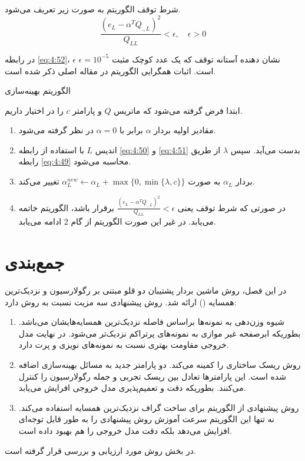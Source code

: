 شرط توقف الگوریتم  به صورت زیر تعریف می‌شود.
\begin{equation}\label{eq:4:52}
\frac{(e_{L} - \alpha^{T}Q_{.,L})^{2}}{Q_{LL}} < \epsilon, \quad \epsilon > 0
\end{equation}

در رابطه \ref{eq:4:52}،  $\epsilon$ نشان دهنده آستانه توقف که یک عدد کوچک مثبت  $\epsilon=10^{-5}$ است. اثبات همگرایی الگوریتم  در مقاله اصلی \cite{peng2014} ذکر شده است. 

\begin{algo}
	الگوریتم بهینه‌سازی 

ابتدا فرض گرفته می‌شود که ماتریس $Q$  و پارامتر $c$  را در اختیار داریم.

\begin{enumerate}
	\item 	مقادیر اولیه بردار $\alpha$  برابر با $\alpha=0$  در نظر گرفته می‌شود.
	\item 	اندیس $L$  با استفاده از رابطه \ref{eq:4:50} و \ref{eq:4:51} بدست می‌آید. سپس $\lambda$  از طریق رابطه \ref{eq:4:49} محاسبه می‌شود.
	\item 	بردار $\alpha_{L}$  به صورت $\alpha^{new}_{L} \leftarrow \alpha_{L} + \mathop{max}\{0, \mathop{min}\{\lambda,c\}\}$  تغییر می‌کند.
	\item 	در صورتی که شرط توقف یعنی $\frac{(e_{L} - \alpha^{T}Q_{.,L})^{2}}{Q_{LL}} < \epsilon$  برقرار باشد، الگوریتم خاتمه می‌یابد. در غیر این صورت الگوریتم از گام 2 ادامه می‌یابد.
\end{enumerate}
\end{algo}

\section{جمع‌بندی}\label{sec:4:8}
در این فصل، روش ماشین بردار پشتیبان دو قلو مبتنی بر رگولارسیون و نزدیک‌ترین همسایه () ارائه شد. روش پیشنهادی سه مزیت نسبت به روش  دارد:
\begin{enumerate}
	\item 	شیوه وزن‌دهی به نمونه‌ها براساس فاصله نزدیک‌ترین همسایه‌هایشان می‌باشد. بطوریکه ابرصفحه غیر موازی به نمونه‌های پرتراکم نزدیک‌تر می‌شود. در نهایت مدل خروجی مقاومت بهتری نسبت به نمونه‌های نویزی و پرت دارد.
	\item 	روش   ریسک ساختاری را کمینه می‌کند. دو پارامتر جدید به مسائل بهینه‌سازی اضافه شده است. این پارامترها تعادل بین ریسک تجربی و جمله رگولارسیون را کنترل می‌کنند. بطوریکه دقت و تعمیم‌پذیری مدل خروجی افرایش می‌یابد.
	\item روش پیشنهادی از الگوریتم  برای ساخت گراف نزدیک‌ترین همسایه استفاده می‌کند. نه تنها این الگوریتم سرعت آموزش روش پیشنهادی را به طور قابل توجه‌ای افزایش می‌دهد بلکه دقت مدل خروجی را هم بهبود داده است.
\end{enumerate}

در بخش روش  مورد ارزیابی و بررسی قرار گرفته است.
